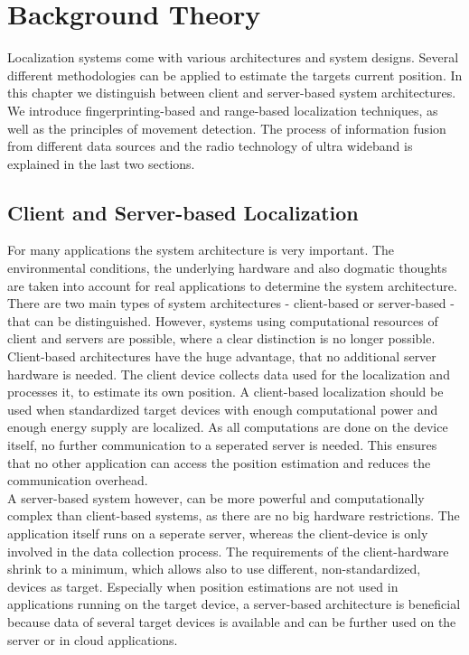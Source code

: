 
\chapter{Background Theory} %

\label{Chapter3} %
Localization systems come with various architectures and system designs. Several different methodologies can be applied to estimate the targets current position. In this chapter we distinguish between client and server-based system architectures. We introduce fingerprinting-based and range-based localization techniques, as well as the principles of movement detection. The process of information fusion from different data sources and the radio technology of ultra wideband is explained in the last two sections.

\section{Client and Server-based Localization}
For many applications the system architecture is very important. The environmental conditions, the underlying hardware and also dogmatic thoughts are taken into account for real applications to determine the system architecture. There are two main types of system architectures - client-based or server-based - that can be distinguished. However, systems using computational resources of client and servers are possible, where a clear distinction is no longer possible.\\
\noindent\hspace*{5mm}%
Client-based architectures have the huge advantage, that no additional server hardware is needed. The client device collects data used for the localization and processes it, to estimate its own position. A client-based localization should be used when standardized target devices with enough computational power and enough energy supply are localized. As all computations are done on the device itself, no further communication to a seperated server is needed. This ensures that no other application can access the position estimation and reduces the communication overhead.\\
\noindent\hspace*{5mm}%
A server-based system however, can be more powerful and computationally complex than client-based systems, as there are no big hardware restrictions. The application itself runs on a seperate server, whereas the client-device is only involved in the data collection process. The requirements of the client-hardware shrink to a minimum, which allows also to use different, non-standardized, devices as target. Especially when position estimations are not used in applications running on the target device, a server-based architecture is beneficial because data of several target devices is available and can be further used on the server or in cloud applications. 


